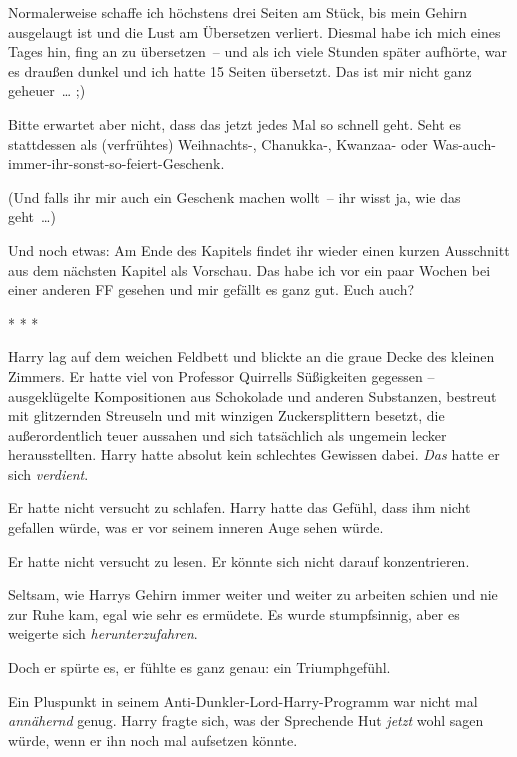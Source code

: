

\hypertarget{der-satz-von-bayes}{%

Normalerweise schaffe ich höchstens drei Seiten am Stück, bis mein Gehirn ausgelaugt ist und die Lust am Übersetzen verliert. Diesmal habe ich mich eines Tages hin, fing an zu übersetzen~-- und als ich viele Stunden später aufhörte, war es draußen dunkel und ich hatte 15 Seiten übersetzt. Das ist mir nicht ganz geheuer~… ;)

Bitte erwartet aber nicht, dass das jetzt jedes Mal so schnell geht. Seht es stattdessen als (verfrühtes) Weihnachts-, Chanukka-, Kwanzaa- oder Was-auch-immer-ihr-sonst-so-feiert-Geschenk.

(Und falls ihr mir auch ein Geschenk machen wollt~-- ihr wisst ja, wie das geht~…)

Und noch etwas: Am Ende des Kapitels findet ihr wieder einen kurzen Ausschnitt aus dem nächsten Kapitel als Vorschau. Das habe ich vor ein paar Wochen bei einer anderen FF gesehen und mir gefällt es ganz gut. Euch auch?

* * *

Harry lag auf dem weichen Feldbett und blickte an die graue Decke des kleinen Zimmers. Er hatte viel von Professor Quirrells Süßigkeiten gegessen -- ausgeklügelte Kompositionen aus Schokolade und anderen Substanzen, bestreut mit glitzernden Streuseln und mit winzigen Zuckersplittern besetzt, die außerordentlich teuer aussahen und sich tatsächlich als ungemein lecker herausstellten. Harry hatte absolut kein schlechtes Gewissen dabei. \emph{Das} hatte er sich \emph{verdient}.

Er hatte nicht versucht zu schlafen. Harry hatte das Gefühl, dass ihm nicht gefallen würde, was er vor seinem inneren Auge sehen würde.

Er hatte nicht versucht zu lesen. Er könnte sich nicht darauf konzentrieren.

Seltsam, wie Harrys Gehirn immer weiter und weiter zu arbeiten schien und nie zur Ruhe kam, egal wie sehr es ermüdete. Es wurde stumpfsinnig, aber es weigerte sich \emph{herunterzufahren}.

Doch er spürte es, er fühlte es ganz genau: ein Triumphgefühl.

Ein Pluspunkt in seinem Anti-Dunkler-Lord-Harry-Programm war nicht mal \emph{annähernd} genug. Harry fragte sich, was der Sprechende Hut \emph{jetzt} wohl sagen würde, wenn er ihn noch mal aufsetzen könnte.

}
